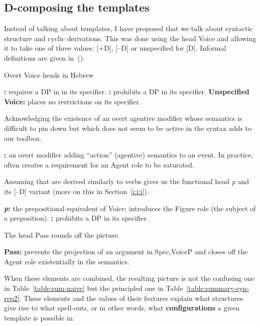 \begin{exe}
\begin{xlist}
\begin{xlist}
\begin{xlist}
\begin{xlist}
\begin{xlist}
\begin{xlist}
	\subsection{D-composing the templates}
Instead of talking about templates, I have proposed that we talk about syntactic structure and cyclic derivations. This was done using the head Voice and allowing it to take one of three values: [\!+\!D], [--D] or unspecified for [D]. Informal definitions are given in~(\nextx).
 \begin{exe}
 \ex  Overt Voice heads in Hebrew 
 \begin{xlist} 
 \ex  \textbf{{\vd}:} requires a DP in in its specifier. 
 \ex  \textbf{{\vz}:} prohibits a DP in its specifier. 
 \ex  \textbf{Unspecified Voice:} places no restrictions on its specifier. 
 \z
\z 

Acknowledging the existence of an overt agentive modifier whose semantics is difficult to pin down but which does not seem to be active in the syntax adds {\va} to our toolbox.
 \begin{exe}
\ex  \textbf{{\va}:} an overt modifier adding ``action'' (agentive) semantics to an event. In practice, often creates a requirement for an Agent role to be saturated. 
 \z 

Assuming that  are derived similarly to verbs gives us the functional head \textit{p} and its [--D] variant {\pz} (more on this in Section~\ref{i:i:i}).
 \begin{exe}
 \ex  
 \begin{xlist} 
 	\ex  \textbf{\textit{p}:} the prepositional equivalent of Voice; introduces the Figure role (the subject of a preposition). 
 	\ex  \textbf{{\pz}:} prohibits a DP in its specifier. 
 \z
\z 

The  head Pass rounds off the picture.
 \begin{exe}
\ex  \textbf{Pass:} prevents the projection of an argument in Spec,VoiceP and closes off the Agent role existentially in the semantics. 
 \z 

When these elements are combined, the resulting picture is not the confusing one in Table~\ref{table:sum-naive} but the principled one in Table~\ref{table:summary-syn-rep2}. These elements and the values of their features explain what structures give rise to what spell-outs, or in other words, what \textbf{configurations} a given template is possible in.
\begin{table}
\end{table}
\end{exe}
\end{xlist}
\end{exe}
\end{exe}
\end{xlist}
\end{exe}
\end{xlist}
\end{xlist}
\end{xlist}
\end{xlist}
\end{xlist}
\end{xlist}
\end{exe}
